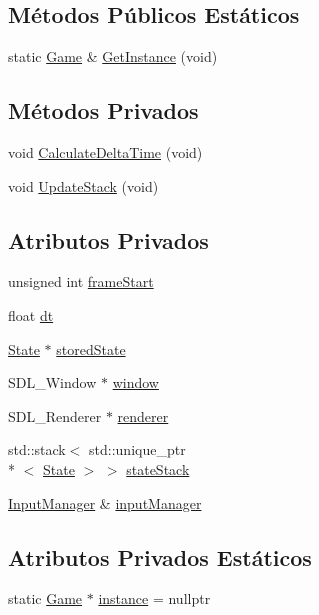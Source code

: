 \subsection*{Métodos Públicos Estáticos}
\begin{DoxyCompactItemize}
\item 
static \hyperlink{classGame}{Game} \& \hyperlink{classGame_a25d213802ed39215e3ab2cb04edf46c8}{Get\+Instance} (void)
\end{DoxyCompactItemize}
\subsection*{Métodos Privados}
\begin{DoxyCompactItemize}
\item 
void \hyperlink{classGame_afddce07e3e3d3ca05a6c2f2ca9e64940}{Calculate\+Delta\+Time} (void)
\item 
void \hyperlink{classGame_ae67b3fda973e4b05513d02c968b0ac17}{Update\+Stack} (void)
\end{DoxyCompactItemize}
\subsection*{Atributos Privados}
\begin{DoxyCompactItemize}
\item 
unsigned int \hyperlink{classGame_af21b5344d8b7796d5f425bdbe37a6c82}{frame\+Start}
\item 
float \hyperlink{classGame_a5184b0439c5cefb45050d0bfaca9ac97}{dt}
\item 
\hyperlink{classState}{State} $\ast$ \hyperlink{classGame_a46a38cae75b6557890d7c47ad8350a1d}{stored\+State}
\item 
S\+D\+L\+\_\+\+Window $\ast$ \hyperlink{classGame_adc376cc3011b5c8f1c3897626100174c}{window}
\item 
S\+D\+L\+\_\+\+Renderer $\ast$ \hyperlink{classGame_ae5164c37c0dc74cfb56041174017bf57}{renderer}
\item 
std\+::stack$<$ std\+::unique\+\_\+ptr\\*
$<$ \hyperlink{classState}{State} $>$ $>$ \hyperlink{classGame_a2706caaad0c60784a6671efc9ee147f8}{state\+Stack}
\item 
\hyperlink{classInputManager}{Input\+Manager} \& \hyperlink{classGame_a57010b9ce85884e0f4059d8d8474e610}{input\+Manager}
\end{DoxyCompactItemize}
\subsection*{Atributos Privados Estáticos}
\begin{DoxyCompactItemize}
\item 
static \hyperlink{classGame}{Game} $\ast$ \hyperlink{classGame_aa469cdc0a30f4fd2d6d99b23f4fbf257}{instance} = nullptr
\end{DoxyCompactItemize}


